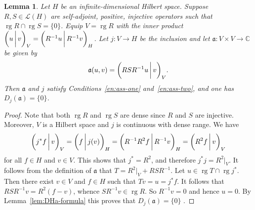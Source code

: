 \documentclass[a4paper,oneside,12pt]{amsart}
\theoremstyle{plain}
\newtheorem{lemma}[theorem]{Lemma}
\theoremstyle{definition}
\begin{document}
\begin{lemma}\label{lem:min-DHa}
Let $H$ be an infinite-dimensional Hilbert space.
Suppose $R,S\in{\mathcal{L}}(H)$ are self-adjoint, positive, injective operators such that $\operatorname{rg} R\cap \operatorname{rg} S=\{0\}$.
Equip $V=\operatorname{rg} R$ with the inner product ${{\ifthenelse{\equal{auto}{auto}}{\left({u}\mkern3mu{\biggm|}\mkern3mu {v}\right)}{}
\ifthenelse{\equal{auto}{b}}{\bigl({u}\mkern3mu{\biggm|}\mkern3mu {v}\bigr)}{}
\ifthenelse{\equal{auto}{B}}{\Bigl({u}\mkern3mu{\bigm|}\mkern3mu {v}\Bigr)}{}
}}_V={{\ifthenelse{\equal{auto}{auto}}{\left({R^{-1}u}\mkern3mu{\biggm|}\mkern3mu {R^{-1}v}\right)}{}
\ifthenelse{\equal{auto}{b}}{\bigl({R^{-1}u}\mkern3mu{\biggm|}\mkern3mu {R^{-1}v}\bigr)}{}
\ifthenelse{\equal{auto}{B}}{\Bigl({R^{-1}u}\mkern3mu{\bigm|}\mkern3mu {R^{-1}v}\Bigr)}{}
}}_H$. Let $j\colon V\to H$ be the inclusion and let ${{\mathfrak{{a}}}}\colon V\times V\to{\mathbb{C}}$ be given by
\[
    {{\mathfrak{{a}}}}(u,v)={{\ifthenelse{\equal{auto}{auto}}{\left({RSR^{-1}u}\mkern3mu{\biggm|}\mkern3mu {v}\right)}{}
\ifthenelse{\equal{auto}{b}}{\bigl({RSR^{-1}u}\mkern3mu{\biggm|}\mkern3mu {v}\bigr)}{}
\ifthenelse{\equal{auto}{B}}{\Bigl({RSR^{-1}u}\mkern3mu{\bigm|}\mkern3mu {v}\Bigr)}{}
}}_V.
\]
Then ${{\mathfrak{{a}}}}$ and $j$ satisfy Conditions~\ref{en:ass-one} and~\ref{en:ass-two}, and one has $D_j({{\mathfrak{{a}}}})=\{0\}$.
\end{lemma}
\begin{proof}
Note that both $\operatorname{rg} R$ and $\operatorname{rg} S$ are dense since $R$ and $S$ are injective.
Moreover, $V$ is a Hilbert space and $j$ is continuous with dense range.
We have
\[
    {{\ifthenelse{\equal{auto}{auto}}{\left({j^*f}\mkern3mu{\biggm|}\mkern3mu {v}\right)}{}
\ifthenelse{\equal{auto}{b}}{\bigl({j^*f}\mkern3mu{\biggm|}\mkern3mu {v}\bigr)}{}
\ifthenelse{\equal{auto}{B}}{\Bigl({j^*f}\mkern3mu{\bigm|}\mkern3mu {v}\Bigr)}{}
}}_V={{\ifthenelse{\equal{auto}{auto}}{\left({f}\mkern3mu{\biggm|}\mkern3mu {j(v)}\right)}{}
\ifthenelse{\equal{auto}{b}}{\bigl({f}\mkern3mu{\biggm|}\mkern3mu {j(v)}\bigr)}{}
\ifthenelse{\equal{auto}{B}}{\Bigl({f}\mkern3mu{\bigm|}\mkern3mu {j(v)}\Bigr)}{}
}}_H = {{\ifthenelse{\equal{auto}{auto}}{\left({R^{-1}R^2f}\mkern3mu{\biggm|}\mkern3mu {R^{-1}v}\right)}{}
\ifthenelse{\equal{auto}{b}}{\bigl({R^{-1}R^2f}\mkern3mu{\biggm|}\mkern3mu {R^{-1}v}\bigr)}{}
\ifthenelse{\equal{auto}{B}}{\Bigl({R^{-1}R^2f}\mkern3mu{\bigm|}\mkern3mu {R^{-1}v}\Bigr)}{}
}}_H = {{\ifthenelse{\equal{auto}{auto}}{\left({R^2f}\mkern3mu{\biggm|}\mkern3mu {v}\right)}{}
\ifthenelse{\equal{auto}{b}}{\bigl({R^2f}\mkern3mu{\biggm|}\mkern3mu {v}\bigr)}{}
\ifthenelse{\equal{auto}{B}}{\Bigl({R^2f}\mkern3mu{\bigm|}\mkern3mu {v}\Bigr)}{}
}}_V
\]
for all $f\in H$ and $v\in V$. This shows that $j^*=R^2$, and therefore $j^*j={\ensuremath{{R^2}|_{{V}}}}$.
It follows from the definition of ${{\mathfrak{{a}}}}$ that $T={\ensuremath{{R^2}|_{{V}}}} + RSR^{-1}$.
Let $u\in\operatorname{rg} T\cap\operatorname{rg} j^*$. Then there exist $v\in V$ and $f\in H$ such that $Tv=u=j^*f$. It follows that $RSR^{-1}v=R^2(f-v)$, whence $SR^{-1}v\in \operatorname{rg} R$. So $R^{-1}v=0$ and hence $u=0$.
By Lemma~\ref{lem:DHa-formula} this proves that $D_j({{\mathfrak{{a}}}})=\{0\}$ .
\end{proof}
\end{document}
